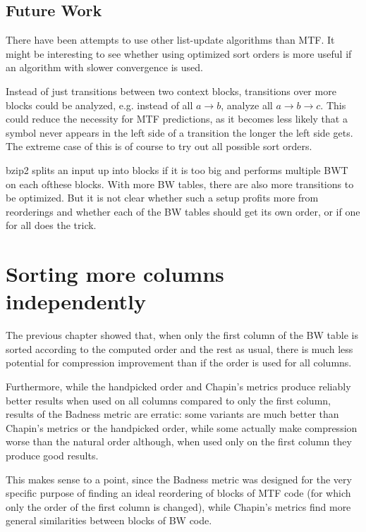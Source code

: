 \documentclass[a4paper]{scrreprt}
\begin{document}
\section{Future Work}

There have been attempts to use other list-update algorithms than MTF. It might
be interesting to see whether using optimized sort orders is more useful if an
algorithm with slower convergence is used.

Instead of just transitions between two context blocks, transitions over more
blocks could be analyzed, e.g. instead of all \(a \rightarrow b\), analyze all
\(a \rightarrow b \rightarrow c\). This could reduce the necessity for MTF
predictions, as it becomes less likely that a symbol never appears in the left
side of a transition the longer the left side gets. The extreme case of this is
of course to try out all possible sort orders.

bzip2 splits an input up into blocks if it is too big and performs multiple BWT
on each ofthese blocks. With more BW tables, there are also more transitions to
be optimized. But it is not clear whether such a setup profits more from
reorderings and whether each of the BW tables should get its own order, or if
one for all does the trick.

\chapter{Sorting more columns independently}

The previous chapter showed that, when only the first column of the BW table is
sorted according to the computed order and the rest as usual, there is much less
potential for compression improvement than if the order is used for all columns.

Furthermore, while the handpicked order and Chapin's metrics produce reliably
better results when used on all columns compared to only the first column,
results of the Badness metric are erratic: some variants are much better than
Chapin's metrics or the handpicked order, while some actually make compression
worse than the natural order although, when used only on the first column they
produce good results.

This makes sense to a point, since the Badness metric was designed for the very
specific purpose of finding an ideal reordering of blocks of MTF code (for
which only the order of the first column is changed), while Chapin's metrics
find more general similarities between blocks of BW code.
\end{document}
